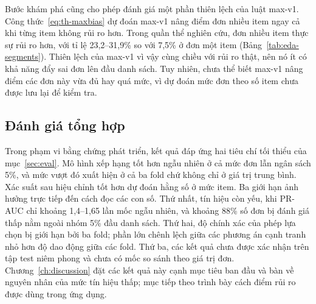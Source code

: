 Bước khám phá cũng cho phép đánh giá một phần thiên lệch của luật max-v1. Công thức~\eqref{eq:th-maxbias} dự đoán max-v1 nâng điểm đơn nhiều item ngay cả khi từng item không rủi ro hơn. Trong quần thể nghiên cứu, đơn nhiều item thực sự rủi ro hơn, với tỉ lệ 23,2--31,9\% so với 7,5\% ở đơn một item (Bảng~\ref{tab:eda-segments}). Thiên lệch của max-v1 vì vậy cùng chiều với rủi ro thật, nên nó ít có khả năng đẩy sai đơn lên đầu danh sách. Tuy nhiên, chưa thể biết max-v1 nâng điểm các đơn này vừa đủ hay quá mức, vì dự đoán mức đơn theo số item chưa được lưu lại để kiểm tra.

\subsection{Đánh giá tổng hợp}\label{sec:analysis-summary}

Trong phạm vi bằng chứng phát triển, kết quả đáp ứng hai tiêu chí tối thiểu của mục~\ref{sec:eval}. Mô hình xếp hạng tốt hơn ngẫu nhiên ở cả mức đơn lẫn ngân sách 5\%, và mức vượt đó xuất hiện ở cả ba fold chứ không chỉ ở giá trị trung bình. Xác suất sau hiệu chỉnh tốt hơn dự đoán hằng số ở mức item. Ba giới hạn ảnh hưởng trực tiếp đến cách đọc các con số. Thứ nhất, tín hiệu còn yếu, khi PR-AUC chỉ khoảng 1,4--1,65 lần mốc ngẫu nhiên, và khoảng 88\% số đơn bị đánh giá thấp nằm ngoài nhóm 5\% đầu danh sách. Thứ hai, độ chính xác của phép lựa chọn bị giới hạn bởi ba fold; phần lớn chênh lệch giữa các phương án cạnh tranh nhỏ hơn độ dao động giữa các fold. Thứ ba, các kết quả chưa được xác nhận trên tập test niêm phong và chưa có mốc so sánh theo giá trị đơn. Chương~\ref{ch:discussion} đặt các kết quả này cạnh mục tiêu ban đầu và bàn về nguyên nhân của mức tín hiệu thấp; mục tiếp theo trình bày cách điểm rủi ro được dùng trong ứng dụng.
